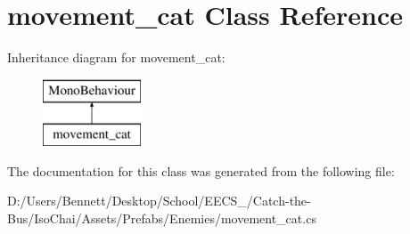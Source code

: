 \hypertarget{classmovement__cat}{}\section{movement\+\_\+cat Class Reference}
\label{classmovement__cat}
Inheritance diagram for movement\+\_\+cat\+:\begin{figure}[H]
\begin{center}
\leavevmode
\includegraphics[height=2.000000cm]{classmovement__cat}
\end{center}
\end{figure}


The documentation for this class was generated from the following file\+:\begin{DoxyCompactItemize}
\item 
D\+:/\+Users/\+Bennett/\+Desktop/\+School/\+E\+E\+C\+S\+\_/\+Catch-\/the-\/\+Bus/\+Iso\+Chai/\+Assets/\+Prefabs/\+Enemies/movement\+\_\+cat.\+cs\end{DoxyCompactItemize}
